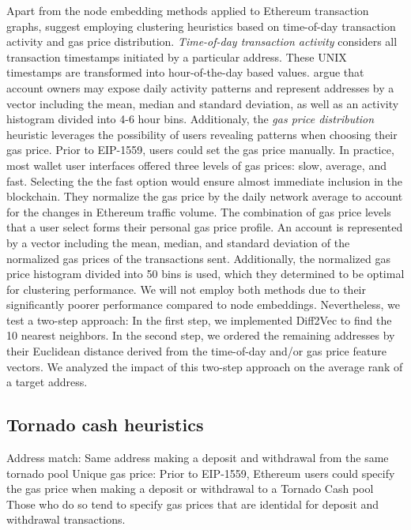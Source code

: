 \documentclass[12pt,a4paper,titlepage,oneside,english]{article}
\begin{document}
Apart from the node embedding methods applied to Ethereum transaction graphs, \cite{Beres2020} suggest employing clustering heuristics based on time-of-day transaction activity and gas price distribution. \newline
\textit{Time-of-day transaction activity} considers all transaction timestamps initiated by a particular address. These UNIX timestamps are transformed into hour-of-the-day based values. \cite{Beres2020} argue that account owners may expose daily activity patterns and represent addresses by a vector including the mean, median and standard deviation, as well as an activity histogram divided into 4-6 hour bins. \newline
Additionaly, the \textit{gas price distribution} heuristic leverages the possibility of users revealing patterns when choosing their gas price. Prior to EIP-1559, users could set the gas price manually. In practice, most wallet user interfaces offered three levels of gas prices: slow, average, and fast. Selecting the the fast option would ensure almost immediate inclusion in the blockchain. They normalize the gas price by the daily network average to account for the changes in Ethereum traffic volume. The combination of gas price levels that a user select forms their personal gas price profile. An account is represented by a vector including the mean, median, and standard deviation of the normalized gas prices of the transactions sent. Additionally, the normalized gas price histogram divided into 50 bins is used, which they determined to be optimal for clustering performance. \newline
We will not employ both methods due to their significantly poorer performance compared to node embeddings. Nevertheless, we test a two-step approach: In the first step, we implemented Diff2Vec to find the 10 nearest neighbors. In the second step, we ordered the remaining addresses by their Euclidean distance derived from the time-of-day and/or gas price feature vectors. We analyzed the impact of this two-step approach on the average rank of a target address.

\subsection{Tornado cash heuristics}
Address match: Same address making a deposit and withdrawal from the same tornado pool
Unique gas price: Prior to EIP-1559, Ethereum users could specify the gas price when making a deposit or withdrawal to a Tornado Cash pool Those who do so tend to specify gas prices that are identidal for deposit and withdrawal transactions. 
\end{document}
